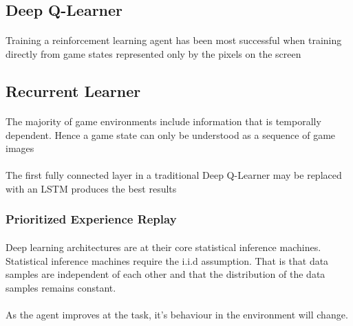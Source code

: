 \documentclass[letterpaper,twocolumn,10pt]{article}
\begin{document}
        \subsection{Deep Q-Learner}
            \paragraph{}Training a reinforcement learning agent has been most successful when training directly from game states represented only by the pixels on the screen~\cite{DBLP:journals/corr/MnihKSGAWR13}

            \subsection{Recurrent Learner}
                \paragraph{}The majority of game environments include information that is temporally dependent. Hence a game state can only be understood as a sequence of game images~\cite{DBLP:journals/corr/HausknechtS15}

                \paragraph{}The first fully connected layer in a traditional Deep Q-Learner may be replaced with an LSTM produces the best results~\cite{DBLP:journals/corr/HausknechtS15}
                

            \subsubsection{Prioritized Experience Replay}
                \paragraph{}Deep learning architectures are at their core statistical inference machines. Statistical inference machines require the i.i.d assumption. That is that data samples are independent of each other and that the distribution of the data samples remains constant.~\cite{DBLP:journals/corr/MnihKSGAWR13} 

                \paragraph{}As the agent improves at the task, it's behaviour in the environment will change. ~\cite{DBLP:journals/corr/MnihKSGAWR13}
\end{document}
